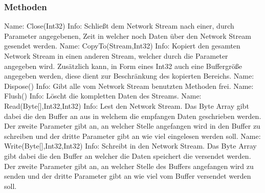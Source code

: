\subsubsection{Methoden}
Name: Close(Int32)
\newline
Info: Schließt dem Network Stream nach einer, durch Parameter angegebenen, Zeit in welcher noch Daten über den Network Stream gesendet werden.
\newline \newline
Name: CopyTo(Stream,Int32)
\newline
Info: Kopiert den gesamten Network Stream in einen anderen Stream, welcher durch die Parameter angegeben wird. Zusätzlich kann, in Form eines Int32 auch eine Buffergröße angegeben werden, diese dient zur Beschränkung des kopierten Bereichs.
\newline \newline
Name: Dispose()
\newline
Info: Gibt alle vom Network Stream benutzten Methoden frei.
\newline \newline
Name: Flush()
\newline
Info: Löscht die kompletten Daten des Streams.
\newline \newline
Name: Read(Byte[],Int32,Int32)
\newline
Info: Lest den Network Stream. Das Byte Array gibt dabei die den Buffer an aus in welchem die empfangen Daten geschrieben werden. Der zweite Parameter gibt an, an welcher Stelle angefangen wird in den Buffer zu schreiben und der dritte Parameter gibt an wie viel eingelesen werden soll.
\newline \newline
Name: Write(Byte[],Int32,Int32)
\newline
Info: Schreibt in den Network Stream. Das Byte Array gibt dabei die den Buffer an welcher die Daten speichert die versendet werden. Der zweite Parameter gibt an, an welcher Stelle des Buffers angefangen wird zu senden und der dritte Parameter gibt an wie viel vom Buffer versendet werden soll.
\newline \newline